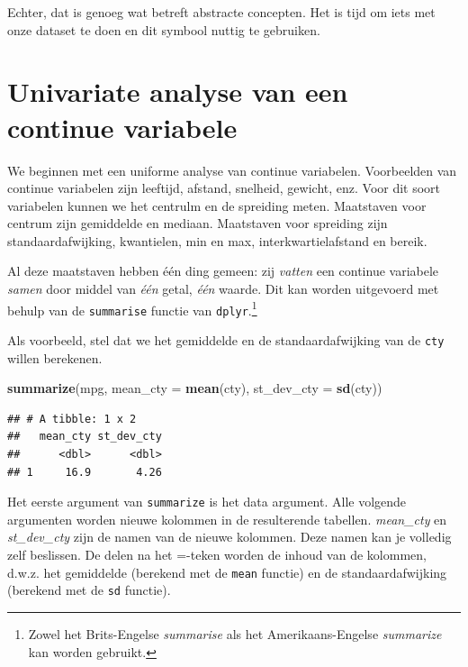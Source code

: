 \documentclass[]{tufte-book}
\newenvironment{Shaded}{}{}
\newcommand{\DataTypeTok}[1]{\textcolor[rgb]{0.56,0.13,0.00}{#1}}
\newcommand{\KeywordTok}[1]{\textcolor[rgb]{0.00,0.44,0.13}{\textbf{#1}}}
\newcommand{\NormalTok}[1]{#1}
\begin{document}
Echter, dat is genoeg wat betreft abstracte concepten. Het is tijd om iets met onze dataset te doen en dit symbool nuttig te gebruiken.

\hypertarget{univariate-analyse-van-een-continue-variabele}{%
\section{Univariate analyse van een continue variabele}\label{univariate-analyse-van-een-continue-variabele}}

We beginnen met een uniforme analyse van continue variabelen. Voorbeelden van continue variabelen zijn leeftijd, afstand, snelheid, gewicht, enz. Voor dit soort variabelen kunnen we het centrulm en de spreiding meten. Maatstaven voor centrum zijn gemiddelde en mediaan. Maatstaven voor spreiding zijn standaardafwijking, kwantielen, min en max, interkwartielafstand en bereik.

Al deze maatstaven hebben één ding gemeen: zij \emph{vatten} een continue variabele \emph{samen} door middel van \emph{één} getal, \emph{één} waarde. Dit kan worden uitgevoerd met behulp van de \texttt{summarise} functie van \texttt{dplyr}.\footnote{Zowel het Brits-Engelse \emph{summarise} als het Amerikaans-Engelse \emph{summarize} kan worden gebruikt.}

Als voorbeeld, stel dat we het gemiddelde en de standaardafwijking van de \texttt{cty} willen berekenen.

\begin{Shaded}
\begin{Highlighting}[]
\KeywordTok{summarize}\NormalTok{(mpg, }\DataTypeTok{mean_cty =} \KeywordTok{mean}\NormalTok{(cty), }\DataTypeTok{st_dev_cty =} \KeywordTok{sd}\NormalTok{(cty))}
\end{Highlighting}
\end{Shaded}

\begin{verbatim}
## # A tibble: 1 x 2
##   mean_cty st_dev_cty
##      <dbl>      <dbl>
## 1     16.9       4.26
\end{verbatim}

Het eerste argument van \texttt{summarize} is het data argument. Alle volgende argumenten worden nieuwe kolommen in de resulterende tabellen. \emph{mean\_cty} en \emph{st\_dev\_cty} zijn de namen van de nieuwe kolommen. Deze namen kan je volledig zelf beslissen. De delen na het =-teken worden de inhoud van de kolommen, d.w.z. het gemiddelde (berekend met de \texttt{mean} functie) en de standaardafwijking (berekend met de \texttt{sd} functie).
\end{document}
